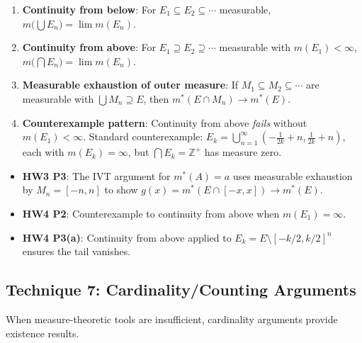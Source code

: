 \documentclass[11pt]{report}
\begin{document}
\begin{rembox}[Strategy]
\begin{enumerate}[label=(\roman*)]
\item \textbf{Continuity from below}: For $E_1 \subseteq E_2 \subseteq \cdots$ measurable, $m\!\bigl(\bigcup E_n\bigr) = \lim m(E_n)$.
\item \textbf{Continuity from above}: For $E_1 \supseteq E_2 \supseteq \cdots$ measurable with $m(E_1) < \infty$, $m\!\bigl(\bigcap E_n\bigr) = \lim m(E_n)$.
\item \textbf{Measurable exhaustion of outer measure}: If $M_1 \subseteq M_2 \subseteq \cdots$ are measurable with $\bigcup M_n \supseteq E$, then $m^*(E \cap M_n) \to m^*(E)$.
\item \textbf{Counterexample pattern}: Continuity from above \textit{fails} without $m(E_1) < \infty$. Standard counterexample: $E_k = \bigcup_{n=1}^\infty (-\frac{1}{2k}+n, \frac{1}{2k}+n)$, each with $m(E_k) = \infty$, but $\bigcap E_k = \mathbb{Z}^+$ has measure zero.
\end{enumerate}
\end{rembox}

\begin{exbox}
\begin{itemize}
\item \textbf{HW3 P3}: The IVT argument for $m^*(A) = a$ uses measurable exhaustion by $M_n = [-n,n]$ to show $g(x) = m^*(E \cap [-x,x]) \to m^*(E)$.
\item \textbf{HW4 P2}: Counterexample to continuity from above when $m(E_1) = \infty$.
\item \textbf{HW4 P3(a)}: Continuity from above applied to $E_k = E \setminus [-k/2, k/2]^n$ ensures the tail vanishes.
\end{itemize}
\end{exbox}

\subsection{Technique 7: Cardinality/Counting Arguments}

When measure-theoretic tools are insufficient, cardinality arguments provide existence results.
\end{document}
